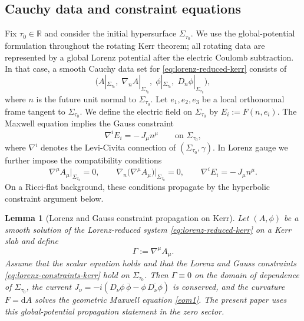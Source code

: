 \documentclass[11pt]{article}
\numberwithin{equation}{section}
\theoremstyle{plain}
\newtheorem{lemma}[theorem]{Lemma}
\theoremstyle{definition}
\theoremstyle{remark}
\newcommand{\dd}{\mathrm{d}}
\begin{document}
\subsection{Cauchy data and constraint equations}\label{subsec:kerr-initial-data}

Fix $\tau_{0}\in\mathbb R$ and consider the initial hypersurface $\Sigma_{\tau_{0}}$.
We use the global-potential formulation throughout the rotating Kerr theorem; all rotating data are represented by a global Lorenz potential after the electric Coulomb subtraction.
In that case, a smooth Cauchy data set for \eqref{eq:lorenz-reduced-kerr} consists of
\begin{equation}\label{eq:kerr-data}
\bigl(A|_{\Sigma_{\tau_{0}}},\;\nabla_{n}A|_{\Sigma_{\tau_{0}}},\;
\phi|_{\Sigma_{\tau_{0}}},\;D_{n}\phi|_{\Sigma_{\tau_{0}}}\bigr),
\end{equation}
where $n$ is the future unit normal to $\Sigma_{\tau_{0}}$.
Let $e_{1},e_{2},e_{3}$ be a local orthonormal frame tangent to $\Sigma_{\tau_{0}}$.
We define the electric field on $\Sigma_{\tau_{0}}$ by $E_{i}:=F(n,e_{i})$.
The Maxwell equation implies the Gauss constraint
\begin{equation}\label{eq:gauss-kerr}
\nabla^{i}E_{i}=-\,J_{\mu}n^{\mu}\qquad\text{on }\Sigma_{\tau_{0}},
\end{equation}
where $\nabla^{i}$ denotes the Levi-Civita connection of $(\Sigma_{\tau_{0}},\gamma)$.
In Lorenz gauge we further impose the compatibility conditions
\begin{equation}\label{eq:lorenz-constraints-kerr}
\nabla^{\mu}A_{\mu}\big|_{\Sigma_{\tau_{0}}}=0,
\qquad
\nabla_{n}\bigl(\nabla^{\mu}A_{\mu}\bigr)\big|_{\Sigma_{\tau_{0}}}=0,
\qquad
\nabla^{i}E_{i}=-\,J_{\mu}n^{\mu}.
\end{equation}
On a Ricci-flat background, these conditions propagate by the hyperbolic constraint argument below.

\begin{lemma}[Lorenz and Gauss constraint propagation on Kerr]\label{lem:kerr-constraint-propagation}
Let $(A,\phi)$ be a smooth solution of the Lorenz-reduced system \eqref{eq:lorenz-reduced-kerr} on a Kerr slab and define
\begin{equation}
\Gamma:=\nabla^{\mu}A_{\mu}.
\end{equation}
Assume that the scalar equation holds and that the Lorenz and Gauss constraints \eqref{eq:lorenz-constraints-kerr} hold on $\Sigma_{\tau_0}$. Then $\Gamma\equiv0$ on the domain of dependence of $\Sigma_{\tau_0}$, the current $J_{\nu}=-i(D_{\nu}\phi\,\overline\phi-\phi\,\overline{D_{\nu}\phi})$ is conserved, and the curvature $F=\dd A$ solves the geometric Maxwell equation \eqref{eom1}. The present paper uses this global-potential propagation statement in the zero sector.
\end{lemma}
\end{document}
